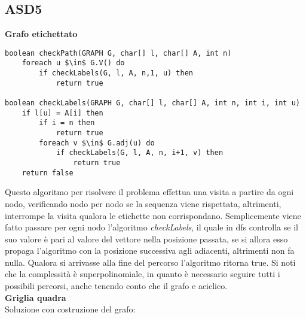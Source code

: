 \documentclass[../cheatSheetAlgoritmi.tex]{subfiles}
\begin{document}
\subsection{ASD5}
\textbf{Grafo etichettato}
\begin{lstlisting}[caption=Il grafo contiene la sottosequenza LODE?]
boolean checkPath(GRAPH G, char[] l, char[] A, int n)
	foreach u $\in$ G.V() do
    	if checkLabels(G, l, A, n,1, u) then
      		return true

boolean checkLabels(GRAPH G, char[] l, char[] A, int n, int i, int u)
	if l[u] = A[i] then
    	if i = n then
      		return true
    	foreach v $\in$ G.adj(u) do
      		if checkLabels(G, l, A, n, i+1, v) then
        		return true
  	return false
\end{lstlisting}
Questo algoritmo per risolvere il problema effettua una visita a
partire da ogni nodo, verificando nodo per nodo se la sequenza viene rispettata, altrimenti, interrompe la
visita qualora le etichette non corrispondano. Semplicemente viene fatto passare per ogni nodo l'algoritmo \textit{checkLabels}, il quale in dfs controlla se il suo valore è pari al valore del vettore nella posizione passata, se si allora esso propaga l'algoritmo con la posizione successiva agli adiacenti, altrimenti non fa nulla. Qualora si arrivasse alla fine del percorso l'algoritmo ritorna true. Si noti che la complessità è superpolinomiale, in quanto è
necessario seguire tutti i possibili percorsi, anche tenendo conto che il
grafo e aciclico.\\
\textbf{Griglia quadra}\\
Soluzione con costruzione del grafo:
\end{document}
